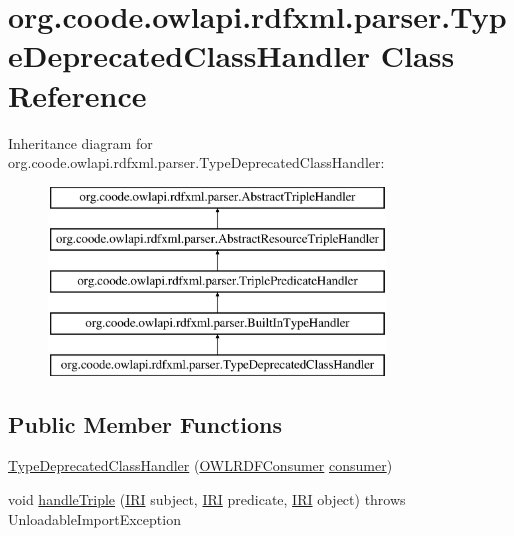 \hypertarget{classorg_1_1coode_1_1owlapi_1_1rdfxml_1_1parser_1_1_type_deprecated_class_handler}{\section{org.\-coode.\-owlapi.\-rdfxml.\-parser.\-Type\-Deprecated\-Class\-Handler Class Reference}
\label{classorg_1_1coode_1_1owlapi_1_1rdfxml_1_1parser_1_1_type_deprecated_class_handler}
}
Inheritance diagram for org.\-coode.\-owlapi.\-rdfxml.\-parser.\-Type\-Deprecated\-Class\-Handler\-:\begin{figure}[H]
\begin{center}
\leavevmode
\includegraphics[height=5.000000cm]{classorg_1_1coode_1_1owlapi_1_1rdfxml_1_1parser_1_1_type_deprecated_class_handler}
\end{center}
\end{figure}
\subsection*{Public Member Functions}
\begin{DoxyCompactItemize}
\item 
\hyperlink{classorg_1_1coode_1_1owlapi_1_1rdfxml_1_1parser_1_1_type_deprecated_class_handler_ade156a8c35834eaca6418f8f7ea08ed6}{Type\-Deprecated\-Class\-Handler} (\hyperlink{classorg_1_1coode_1_1owlapi_1_1rdfxml_1_1parser_1_1_o_w_l_r_d_f_consumer}{O\-W\-L\-R\-D\-F\-Consumer} \hyperlink{classorg_1_1coode_1_1owlapi_1_1rdfxml_1_1parser_1_1_abstract_triple_handler_a4ccf4d898ff01eb1cadfa04b23d54e9c}{consumer})
\item 
void \hyperlink{classorg_1_1coode_1_1owlapi_1_1rdfxml_1_1parser_1_1_type_deprecated_class_handler_ac465643e39c7480704522257422dc06f}{handle\-Triple} (\hyperlink{classorg_1_1semanticweb_1_1owlapi_1_1model_1_1_i_r_i}{I\-R\-I} subject, \hyperlink{classorg_1_1semanticweb_1_1owlapi_1_1model_1_1_i_r_i}{I\-R\-I} predicate, \hyperlink{classorg_1_1semanticweb_1_1owlapi_1_1model_1_1_i_r_i}{I\-R\-I} object)  throws Unloadable\-Import\-Exception 
\end{DoxyCompactItemize}
